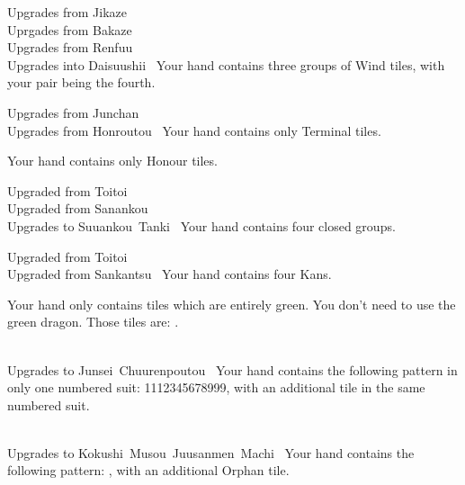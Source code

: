 	{\upgradesfrom Upgrades from Jikaze~\\
	\upgradesfrom Uprgades from Bakaze~\\
	\upgradesfrom Upgrades from Renfuu~ \\
	\upgradesto Upgrades into Daisuushii~}
	{Your hand contains three groups of Wind tiles, with your pair being the fourth.}

	{\upgradesfrom Upgrades from Junchan~ \\
	\upgradesfrom Upgrades from Honroutou~}
	{Your hand contains only Terminal tiles.}

	{}
	{Your hand contains only Honour tiles.}

	{\upgradesfrom Upgraded from Toitoi~ \\
	\upgradesfrom Upgraded from Sanankou~ \\
	\upgradesto Upgrades to Suuankou~Tanki~}
	{Your hand contains four closed groups.}

	{\upgradesfrom Upgraded from Toitoi~ \\
	\upgradesfrom Upgraded from Sankantsu~}
	{Your hand contains four Kans.}

	{}
	{Your hand only contains tiles which are entirely green. You don't need to use the green dragon. Those tiles are: {}.}

	{\closedhand \\
	\upgradesto Upgrades to Junsei~Chuurenpoutou~}
	{Your hand contains the following pattern in only one numbered suit: 1112345678999, with an additional tile in the same numbered suit.}

	{\closedhand \\
	\upgradesto Upgrades to Kokushi~Musou~Juusanmen~Machi~}
	{Your hand contains the following pattern: {}, with an additional Orphan tile.}


